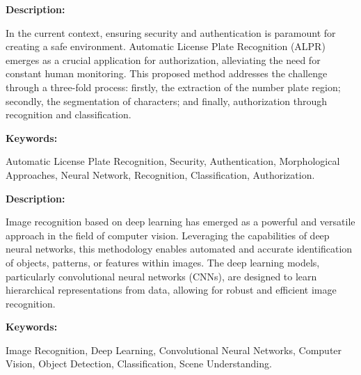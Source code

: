 { 
	
	\textbf{Description:}
	
	In the current context, ensuring security and authentication is paramount for creating a safe environment. Automatic License Plate Recognition (ALPR) emerges as a crucial application for authorization, alleviating the need for constant human monitoring. This proposed method addresses the challenge through a three-fold process: firstly, the extraction of the number plate region; secondly, the segmentation of characters; and finally, authorization through recognition and classification.\autocite{Sandha:2017}
	
	
	
	\textbf{Keywords:} 
	
	Automatic License Plate Recognition, Security, Authentication, Morphological Approaches, Neural Network, Recognition, Classification, Authorization.
	
	
}




{ 
	
	\textbf{Description:}
	
	Image recognition based on deep learning has emerged as a powerful and versatile approach in the field of computer vision. Leveraging the capabilities of deep neural networks, this methodology enables automated and accurate identification of objects, patterns, or features within images. The deep learning models, particularly convolutional neural networks (CNNs), are designed to learn hierarchical representations from data, allowing for robust and efficient image recognition.\autocite{Wu:2015}

	
	
	
	\textbf{Keywords:} 
	
	Image Recognition, Deep Learning, Convolutional Neural Networks, Computer Vision, Object Detection, Classification, Scene Understanding.

	
}


